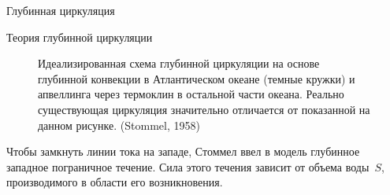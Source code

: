 \begin{chapter}{Глубинная циркуляция}
\begin{section}{Теория глубинной циркуляции}
\begin{figure}[t!]
\caption{Идеализированная схема глубинной циркуляции на основе глубинной
конвекции в Атлантическом океане (темные кружки) и 
апвеллинга через 
термоклин в остальной части океана. 
Реально существующая циркуляция значительно отличается от показанной
на данном рисунке. (Stommel, 1958)}
\label{fig:stommeldeep}
\end{figure}
%
%

Чтобы замкнуть линии тока на западе, Стоммел ввел в модель глубинное западное
пограничное течение. Сила этого течения зависит от объема воды~$S$, 
производимого в области его возникновения.
%


\end{section}
\end{chapter}
